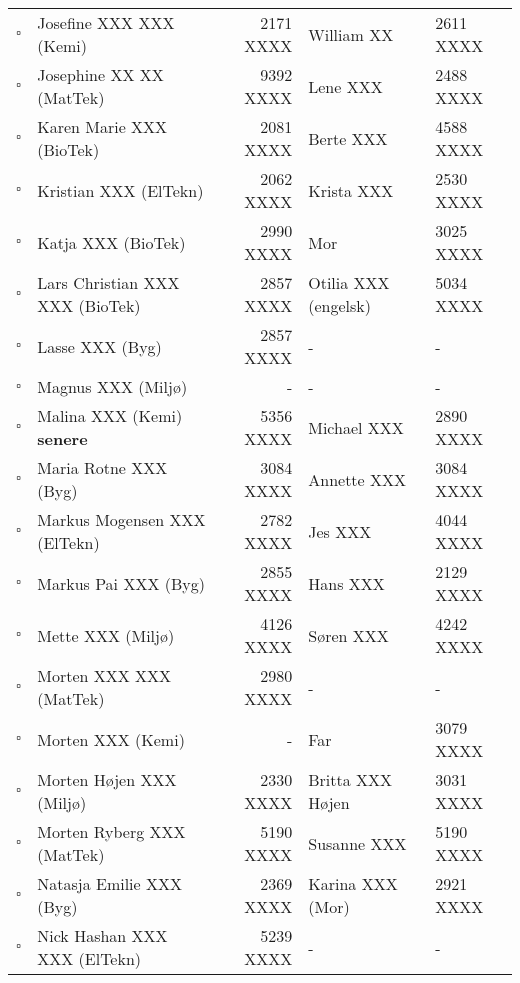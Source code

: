\begin{table}[H]
\begin{tabu}{l l r l l}
$\square$ & Josefine XXX XXX (Kemi)         & 2171 XXXX & William XX & 2611 XXXX  \\
$\square$ & Josephine XX XX (MatTek)             & 9392 XXXX & Lene XXX           & 2488 XXXX  \\
$\square$ & Karen Marie XXX (BioTek)               & 2081 XXXX & Berte XXX        & 4588 XXXX  \\
$\square$ & Kristian XXX (ElTekn)                   & 2062 XXXX & Krista XXX       & 2530 XXXX  \\
$\square$ & Katja XXX (BioTek)                      & 2990 XXXX & Mor                   & 3025 XXXX  \\
$\square$ & Lars Christian XXX XXX (BioTek)     & 2857 XXXX & Otilia XXX (engelsk) & 5034 XXXX  \\
$\square$ & Lasse XXX (Byg)                           & 2857 XXXX & -                     & -         \\
$\square$ & Magnus XXX (Miljø)                           & -         & -                     & -         \\
$\square$ & Malina  XXX (Kemi) \textbf{senere}        & 5356 XXXX & Michael XXX        & 2890 XXXX  \\
$\square$ & Maria Rotne XXX (Byg)                   & 3084 XXXX & Annette XXX      & 3084 XXXX  \\
$\square$ & Markus Mogensen XXX (ElTekn)           & 2782 XXXX & Jes XXX         & 4044 XXXX  \\
$\square$ & Markus Pai XXX (Byg)                    & 2855 XXXX & Hans XXX         & 2129 XXXX  \\
$\square$ & Mette XXX (Miljø)               & 4126 XXXX & Søren XXX          & 4242 XXXX  \\
$\square$ & Morten XXX XXX (MatTek)               & 2980 XXXX & -                     & -         \\
$\square$ & Morten XXX (Kemi)                         & -         & Far                   & 3079 XXXX  \\
$\square$ & Morten Højen XXX (Miljø)             & 2330 XXXX & Britta XXX Højen & 3031 XXXX  \\
$\square$ & Morten Ryberg XXX (MatTek)             & 5190 XXXX & Susanne XXX     & 5190 XXXX  \\
$\square$ & Natasja Emilie XXX (Byg)               & 2369 XXXX & Karina XXX (Mor)   & 2921 XXXX  \\
$\square$ & Nick Hashan XXX XXX (ElTekn)       & 5239 XXXX & -                     & -         \\

\end{tabu}
\end{table}
